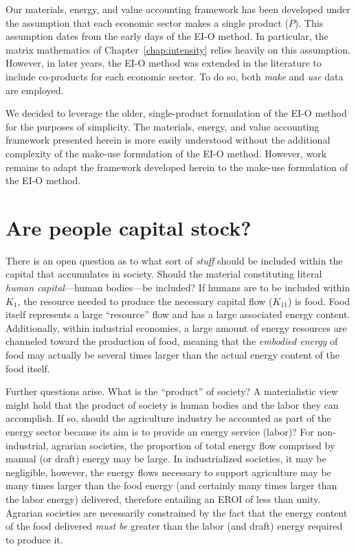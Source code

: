 Our materials, energy, and value accounting framework 
has been developed under the assumption 
that each economic sector makes a single product ($\dot{P}$).
This assumption dates from the early days of the EI-O method.\cite{Bullard-III:1975aa}
In particular, the matrix mathematics of Chapter~\ref{chap:intensity}
relies heavily on this assumption. 
However, in later years, the EI-O method was extended 
in the literature to include
co-products for each economic sector.\cite{Costanza:1984tq,Casler1984} 
To do so, both \emph{make} and \emph{use} data are employed.

We decided to leverage the older,
single-product formulation of the EI-O method
for the purposes of simplicity. 
The materials, energy, and value accounting framework
presented herein is more easily understood 
without the additional complexity of the make-use formulation 
of the EI-O method.
However, work remains to adapt the framework
developed herein to the make-use formulation of the EI-O method.


\section{Are people capital stock?}
\label{sec:people_as_stock}

There is an open
question as to what sort of \emph{stuff} 
should be included within the capital
that accumulates in society. 
Should the material constituting literal
\emph{human capital}---human bodies---be included? 
If humans are to be included within $K_{1}$, 
the resource needed to produce the necessary capital
flow ($\dot{K}_{11}$) is food. 
Food itself represents a large ``resource''
flow and has a large associated energy content. 
Additionally, 
within industrial economies, 
a large amount of energy resources 
are channeled toward the production of food, 
meaning that the \emph{embodied energy}
of food may actually be several times larger than
the actual energy content of the food itself. 

Further questions arise. 
What is the ``product'' of society? 
A materialistic view might hold that the product of
society is human bodies and the labor they can accomplish. 
If so, 
should the agriculture industry 
be accounted as part of the energy sector 
because its aim is to provide 
an energy service (labor)? 
For non-industrial, agrarian societies, 
the proportion of total energy flow 
comprised by manual (or draft) energy 
may be large. 
In industrialized societies, 
it may be negligible, 
however, 
the energy flows necessary to support agriculture
may be many times larger than the food energy
(and certainly many times larger 
than the labor energy) 
delivered, therefore entailing an EROI of less than unity. 
Agrarian societies are necessarily constrained 
by the fact that the energy content of the food delivered 
\emph{must be} greater than the labor (and draft) 
energy required to produce it.

